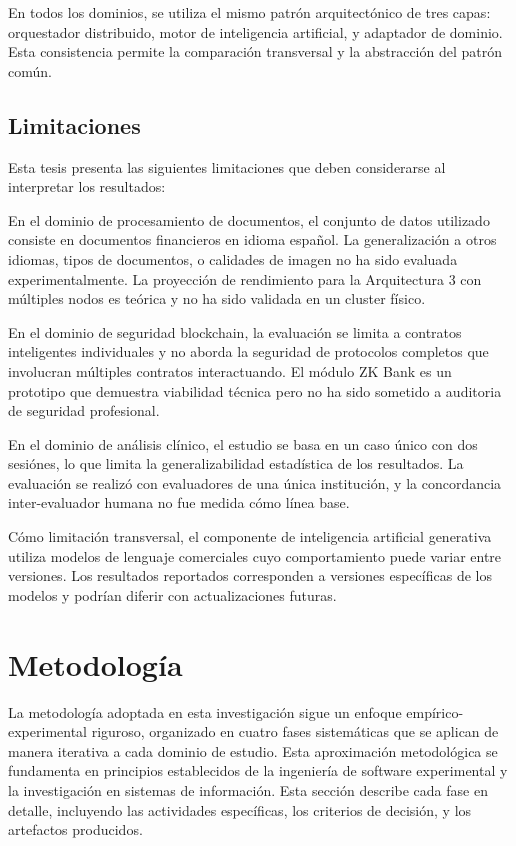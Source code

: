 \documentclass[12pt,a4paper,twoside]{book}
\begin{document}
En todos los dominios, se utiliza el mismo patrón arquitectónico de tres capas: orquestador distribuido, motor de inteligencia artificial, y adaptador de dominio. Esta consistencia permite la comparación transversal y la abstracción del patrón común.

\subsection{Limitaciones}

Esta tesis presenta las siguientes limitaciones que deben considerarse al interpretar los resultados:

En el dominio de procesamiento de documentos, el conjunto de datos utilizado consiste en documentos financieros en idioma español. La generalización a otros idiomas, tipos de documentos, o calidades de imagen no ha sido evaluada experimentalmente. La proyección de rendimiento para la Arquitectura 3 con múltiples nodos es teórica y no ha sido validada en un cluster físico.

En el dominio de seguridad blockchain, la evaluación se limita a contratos inteligentes individuales y no aborda la seguridad de protocolos completos que involucran múltiples contratos interactuando. El módulo ZK Bank es un prototipo que demuestra viabilidad técnica pero no ha sido sometido a auditoria de seguridad profesional.

En el dominio de análisis clínico, el estudio se basa en un caso único con dos sesiónes, lo que limita la generalizabilidad estadística de los resultados. La evaluación se realizó con evaluadores de una única institución, y la concordancia inter-evaluador humana no fue medida cómo línea base.

Cómo limitación transversal, el componente de inteligencia artificial generativa utiliza modelos de lenguaje comerciales cuyo comportamiento puede variar entre versiones. Los resultados reportados corresponden a versiones específicas de los modelos y podrían diferir con actualizaciones futuras.

\section{Metodología}

La metodología adoptada en esta investigación sigue un enfoque empírico-experimental riguroso, organizado en cuatro fases sistemáticas que se aplican de manera iterativa a cada dominio de estudio. Esta aproximación metodológica se fundamenta en principios establecidos de la ingeniería de software experimental \cite{wohlin2012experimentation} y la investigación en sistemas de información. Esta sección describe cada fase en detalle, incluyendo las actividades específicas, los criterios de decisión, y los artefactos producidos.
\end{document}
